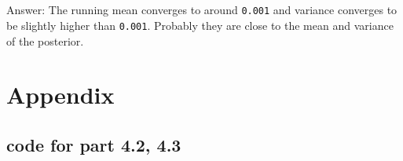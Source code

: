\documentclass[11pt]{article}
\begin{document}
    \begin{center}
    \end{center}
    { \hspace*{\fill} \\}
    
    \begin{center}
    \end{center}
    { \hspace*{\fill} \\}
    
    Answer: The running mean converges to around \texttt{0.001} and variance
converges to be slightly higher than \texttt{0.001}. Probably they are
close to the mean and variance of the posterior.

    \section{Appendix}\label{appendix}

    \subsection{code for part 4.2, 4.3}\label{code-for-part-4.2-4.3}
\end{document}
